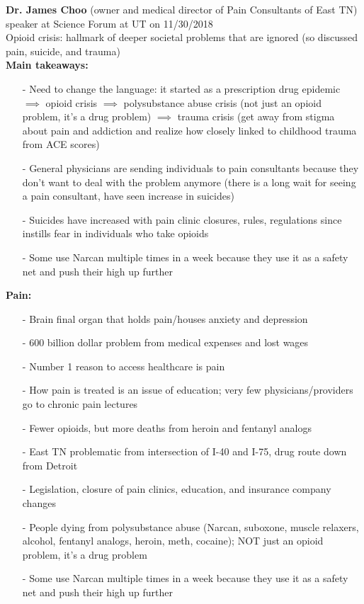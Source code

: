\documentclass[12pt]{article}
\begin{document}
\textbf{Dr. James Choo} (owner and medical director of Pain Consultants of East TN) speaker at Science Forum at UT on 11/30/2018 \\
Opioid crisis: hallmark of deeper societal problems that are ignored (so discussed pain, suicide, and trauma) \\

\textbf{Main takeaways:} 
\begin{itemize}
\item[-] Need to change the language: it started as a prescription drug epidemic $\implies$ opioid crisis $\implies$ polysubstance abuse crisis (not just an opioid problem, it's a drug problem) $\implies$ trauma crisis (get away from stigma about pain and addiction and realize how closely linked to childhood trauma from ACE scores) 
\item[-] General physicians are sending individuals to pain consultants because they don't want to deal with the problem anymore (there is a long wait for seeing a pain consultant, have seen increase in suicides) 
\item[-] Suicides have increased with pain clinic closures, rules, regulations since instills fear in individuals who take opioids
\item[-] Some use Narcan multiple times in a week because they use it as a safety net and push their high up further 
\end{itemize}

\textbf{Pain:}
\begin{itemize}
\item[-] Brain final organ that holds pain/houses anxiety and depression 
\item[-] 600 billion dollar problem from medical expenses and lost wages 
\item[-] Number 1 reason to access healthcare is pain
\item[-] How pain is treated is an issue of education; very few physicians/providers go to chronic pain lectures 
\item[-] Fewer opioids, but more deaths from heroin and fentanyl analogs 
\item[-] East TN problematic from intersection of I-40 and I-75, drug route down from Detroit 
\item[-] Legislation, closure of pain clinics, education, and insurance company changes
\item[-] People dying from polysubstance abuse (Narcan, suboxone, muscle relaxers, alcohol, fentanyl analogs, heroin, meth, cocaine); NOT just an opioid problem, it's a drug problem
\item[-] Some use Narcan multiple times in a week because they use it as a safety net and push their high up further 
\end{itemize}
\end{document}
